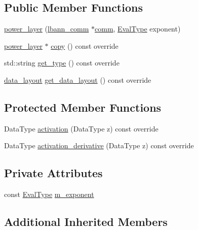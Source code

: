 \subsection*{Public Member Functions}
\begin{DoxyCompactItemize}
\item 
\hyperlink{classlbann_1_1power__layer_a0429ad3cad14663b8fea013360b60e04}{power\+\_\+layer} (\hyperlink{classlbann_1_1lbann__comm}{lbann\+\_\+comm} $\ast$\hyperlink{file__io_8cpp_ab048c6f9fcbcfaa57ce68b00263dbebe}{comm}, \hyperlink{base_8hpp_a3266f5ac18504bbadea983c109566867}{Eval\+Type} exponent)
\item 
\hyperlink{classlbann_1_1power__layer}{power\+\_\+layer} $\ast$ \hyperlink{classlbann_1_1power__layer_adb52a06aad68e2daee5ce2b738954bcb}{copy} () const override
\item 
std\+::string \hyperlink{classlbann_1_1power__layer_ab92cf57b093aea946fe60369226ac80a}{get\+\_\+type} () const override
\item 
\hyperlink{base_8hpp_a786677cbfb3f5677b4d84f3056eb08db}{data\+\_\+layout} \hyperlink{classlbann_1_1power__layer_aa0b786025082b0d95484ebe58eb0b331}{get\+\_\+data\+\_\+layout} () const override
\end{DoxyCompactItemize}
\subsection*{Protected Member Functions}
\begin{DoxyCompactItemize}
\item 
Data\+Type \hyperlink{classlbann_1_1power__layer_ad7b7265367e2623fcd242920737a3acb}{activation} (Data\+Type z) const override
\item 
Data\+Type \hyperlink{classlbann_1_1power__layer_af879c6b5488e1c8efe9e8c92b1be474c}{activation\+\_\+derivative} (Data\+Type z) const override
\end{DoxyCompactItemize}
\subsection*{Private Attributes}
\begin{DoxyCompactItemize}
\item 
const \hyperlink{base_8hpp_a3266f5ac18504bbadea983c109566867}{Eval\+Type} \hyperlink{classlbann_1_1power__layer_a778b995d25e24f5c82ab85cfeab2ee41}{m\+\_\+exponent}
\end{DoxyCompactItemize}
\subsection*{Additional Inherited Members}


